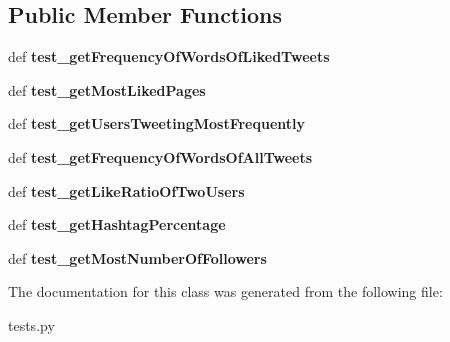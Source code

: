 \subsection*{Public Member Functions}
\begin{DoxyCompactItemize}
\item 
\hypertarget{classtwitter_1_1tests_1_1StatsTestCases_a924d247a4518455ba5ad682e9e7f95b4}{def {\bfseries test\-\_\-get\-Frequency\-Of\-Words\-Of\-Liked\-Tweets}}\label{classtwitter_1_1tests_1_1StatsTestCases_a924d247a4518455ba5ad682e9e7f95b4}

\item 
\hypertarget{classtwitter_1_1tests_1_1StatsTestCases_abdf69a763661d75a0abcd8d02182204d}{def {\bfseries test\-\_\-get\-Most\-Liked\-Pages}}\label{classtwitter_1_1tests_1_1StatsTestCases_abdf69a763661d75a0abcd8d02182204d}

\item 
\hypertarget{classtwitter_1_1tests_1_1StatsTestCases_ac9bc89051719ae99de701333f1cad0a2}{def {\bfseries test\-\_\-get\-Users\-Tweeting\-Most\-Frequently}}\label{classtwitter_1_1tests_1_1StatsTestCases_ac9bc89051719ae99de701333f1cad0a2}

\item 
\hypertarget{classtwitter_1_1tests_1_1StatsTestCases_ac284bee5f974f70566ad7994ce85d6db}{def {\bfseries test\-\_\-get\-Frequency\-Of\-Words\-Of\-All\-Tweets}}\label{classtwitter_1_1tests_1_1StatsTestCases_ac284bee5f974f70566ad7994ce85d6db}

\item 
\hypertarget{classtwitter_1_1tests_1_1StatsTestCases_aa0c7de435227ee6b49566f4cebe41801}{def {\bfseries test\-\_\-get\-Like\-Ratio\-Of\-Two\-Users}}\label{classtwitter_1_1tests_1_1StatsTestCases_aa0c7de435227ee6b49566f4cebe41801}

\item 
\hypertarget{classtwitter_1_1tests_1_1StatsTestCases_afeb0ed8b27ae13e5a15dc722da42c0e8}{def {\bfseries test\-\_\-get\-Hashtag\-Percentage}}\label{classtwitter_1_1tests_1_1StatsTestCases_afeb0ed8b27ae13e5a15dc722da42c0e8}

\item 
\hypertarget{classtwitter_1_1tests_1_1StatsTestCases_a8402cdedfe664593cbffff181f066b99}{def {\bfseries test\-\_\-get\-Most\-Number\-Of\-Followers}}\label{classtwitter_1_1tests_1_1StatsTestCases_a8402cdedfe664593cbffff181f066b99}

\end{DoxyCompactItemize}


The documentation for this class was generated from the following file\-:\begin{DoxyCompactItemize}
\item 
tests.\-py\end{DoxyCompactItemize}
